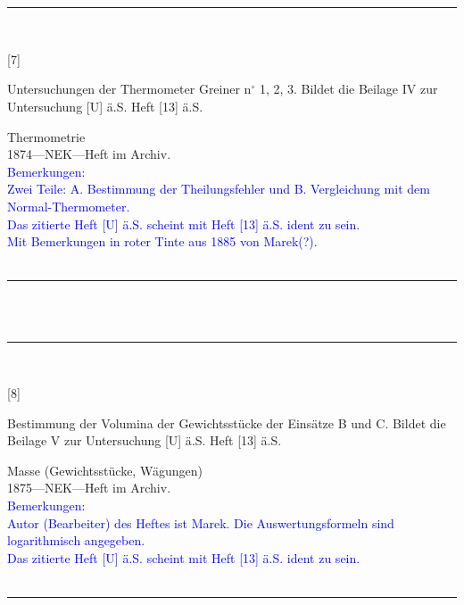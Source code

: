 \\
\vspace*{-2.5pt}\\
\parbox{\textwidth}{%
\rule{\textwidth}{1pt}\vspace*{-3mm}\\
\begin{minipage}[t]{0.1\textwidth}\vspace{0pt}
\Huge\rule[-4mm]{0cm}{1cm}[7]
\end{minipage}
\hfill
\begin{minipage}[t]{0.9\textwidth}\vspace{0pt}
\large Untersuchungen der Thermometer Greiner n{$^\circ$} 1, 2, 3. Bildet die Beilage IV zur Untersuchung [U] ä.S. Heft [13] ä.S.\rule[-2mm]{0mm}{2mm}
\end{minipage}
{\footnotesize\flushright
Thermometrie\\
}
1874\quad---\quad NEK\quad---\quad Heft im Archiv.\\
\textcolor{blue}{Bemerkungen:\\{}
Zwei Teile: A. Bestimmung der Theilungsfehler und B. Vergleichung mit dem Normal-Thermometer.\\{}
Das zitierte Heft [U] ä.S. scheint mit Heft [13] ä.S. ident zu sein.\\{}
Mit Bemerkungen in roter Tinte aus 1885 von Marek(?).\\{}
}
\\[-15pt]
\rule{\textwidth}{1pt}
}
\\
\vspace*{-2.5pt}\\
\parbox{\textwidth}{%
\rule{\textwidth}{1pt}\vspace*{-3mm}\\
\begin{minipage}[t]{0.1\textwidth}\vspace{0pt}
\Huge\rule[-4mm]{0cm}{1cm}[8]
\end{minipage}
\hfill
\begin{minipage}[t]{0.9\textwidth}\vspace{0pt}
\large Bestimmung der Volumina der Gewichtsstücke der Einsätze B und C. Bildet die Beilage V zur Untersuchung [U] ä.S. Heft [13] ä.S.\rule[-2mm]{0mm}{2mm}
\end{minipage}
{\footnotesize\flushright
Masse (Gewichtsstücke, Wägungen)\\
}
1875\quad---\quad NEK\quad---\quad Heft im Archiv.\\
\textcolor{blue}{Bemerkungen:\\{}
Autor (Bearbeiter) des Heftes ist Marek. Die Auswertungsformeln sind logarithmisch angegeben.\\{}
Das zitierte Heft [U] ä.S. scheint mit Heft [13] ä.S. ident zu sein.\\{}
}
\\[-15pt]
\rule{\textwidth}{1pt}
}
